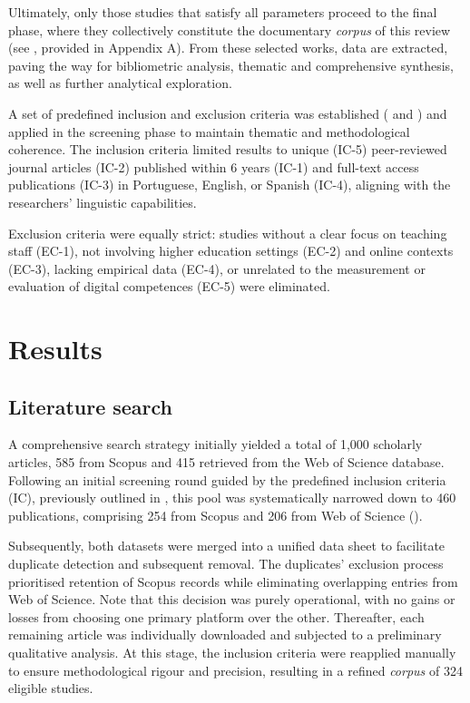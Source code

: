 \documentclass[english]{textolivre}
\begin{document}
Ultimately, only those studies that satisfy all parameters proceed to the final phase, where they collectively constitute the documentary \textit{corpus} of this review (see , provided in Appendix A). From these selected works, data are extracted, paving the way for bibliometric analysis, thematic and comprehensive synthesis, as well as further analytical exploration.

A set of predefined inclusion and exclusion criteria was established ( and  ) and applied in the screening phase to maintain thematic and methodological coherence. The inclusion criteria limited results to unique (IC-5) peer-reviewed journal articles (IC-2) published within 6 years (IC-1) and full-text access publications (IC-3) in Portuguese, English, or Spanish (IC-4), aligning with the researchers’ linguistic capabilities.

Exclusion criteria were equally strict: studies without a clear focus on teaching staff (EC-1), not involving higher education settings (EC-2) and online contexts (EC-3), lacking empirical data (EC-4), or unrelated to the measurement or evaluation of digital competences (EC-5) were eliminated.


\section{Results}\label{sec-titulo}
\subsection{Literature search}
A comprehensive search strategy initially yielded a total of 1,000 scholarly articles, 585 from Scopus and 415 retrieved from the Web of Science database. Following an initial screening round guided by the predefined inclusion criteria (IC), previously outlined in , this pool was systematically narrowed down to 460 publications, comprising 254 from Scopus and 206 from Web of Science ().

Subsequently, both datasets were merged into a unified data sheet to facilitate duplicate detection and subsequent removal. The duplicates’ exclusion process prioritised retention of Scopus records while eliminating overlapping entries from Web of Science. Note that this decision was purely operational, with no gains or losses from choosing one primary platform over the other. Thereafter, each remaining article was individually downloaded and subjected to a preliminary qualitative analysis. At this stage, the inclusion criteria were reapplied manually to ensure methodological rigour and precision, resulting in a refined \textit{corpus} of 324 eligible studies.
\end{document}
